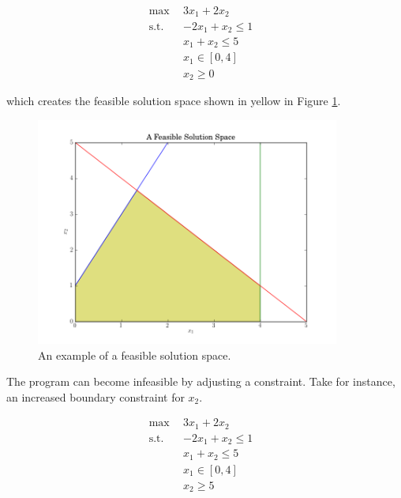 \begin{subequations}\label{eqs:feas}
  \begin{align}
    \max \:\: & 
    3 x_1 + 2 x_2
    & \label{eqs:feas_obj} \\
    \text{s.t.} \:\: &
    -2 x_1 + x_2 \leq 1 \\
    &
    x_1 + x_2 \leq 5 
    & \label{eqs:feas_sup} \\
    &
    x_1 \in [0, 4]
    &\label{eqs:feas_x1} \\
    &
    x_2 \geq 0
    &\label{eqs:feas_x2}
  \end{align}
\end{subequations}

which creates the feasible solution space shown in yellow in
Figure \ref{fig:feasible}.

\begin{figure}[H]
  \begin{center}
    \includegraphics[height=7.5cm]{./chapters/litreview/plots/feasible.png}
  \caption{An example of a feasible solution space.}
  \label{fig:feasible}
  \end{center}
\end{figure}

The program can become infeasible by adjusting a constraint. Take for instance,
an increased boundary constraint for $x_2$.

\begin{subequations}\label{eqs:infeas}
  \begin{align}
    \max \:\: & 
    3 x_1 + 2 x_2
    & \label{eqs:infeas_obj} \\
    \text{s.t.} \:\: &
    -2 x_1 + x_2 \leq 1 \\
    &
    x_1 + x_2 \leq 5 
    & \label{eqs:infeas_sup} \\
    &
    x_1 \in [0, 4]
    &\label{eqs:infeas_x1} \\
    &
    x_2 \geq 5
    &\label{eqs:infeas_x2}
  \end{align}
\end{subequations}

